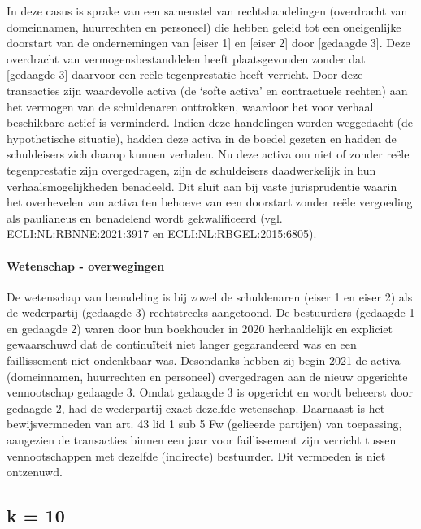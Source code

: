 \documentclass[
  dutch,
  a4paper,
]{article}
\begin{document}
In deze casus is sprake van een samenstel van rechtshandelingen (overdracht van domeinnamen, huurrechten en personeel) die hebben geleid tot een oneigenlijke doorstart van de ondernemingen van {[}eiser 1{]} en {[}eiser 2{]} door {[}gedaagde 3{]}. Deze overdracht van vermogensbestanddelen heeft plaatsgevonden zonder dat {[}gedaagde 3{]} daarvoor een reële tegenprestatie heeft verricht. Door deze transacties zijn waardevolle activa (de `softe activa' en contractuele rechten) aan het vermogen van de schuldenaren onttrokken, waardoor het voor verhaal beschikbare actief is verminderd. Indien deze handelingen worden weggedacht (de hypothetische situatie), hadden deze activa in de boedel gezeten en hadden de schuldeisers zich daarop kunnen verhalen. Nu deze activa om niet of zonder reële tegenprestatie zijn overgedragen, zijn de schuldeisers daadwerkelijk in hun verhaalsmogelijkheden benadeeld. Dit sluit aan bij vaste jurisprudentie waarin het overhevelen van activa ten behoeve van een doorstart zonder reële vergoeding als paulianeus en benadelend wordt gekwalificeerd (vgl. ECLI:NL:RBNNE:2021:3917 en ECLI:NL:RBGEL:2015:6805).

\paragraph{Wetenschap - overwegingen}\label{wetenschap---overwegingen-23}

De wetenschap van benadeling is bij zowel de schuldenaren (eiser 1 en eiser 2) als de wederpartij (gedaagde 3) rechtstreeks aangetoond. De bestuurders (gedaagde 1 en gedaagde 2) waren door hun boekhouder in 2020 herhaaldelijk en expliciet gewaarschuwd dat de continuïteit niet langer gegarandeerd was en een faillissement niet ondenkbaar was. Desondanks hebben zij begin 2021 de activa (domeinnamen, huurrechten en personeel) overgedragen aan de nieuw opgerichte vennootschap gedaagde 3. Omdat gedaagde 3 is opgericht en wordt beheerst door gedaagde 2, had de wederpartij exact dezelfde wetenschap. Daarnaast is het bewijsvermoeden van art. 43 lid 1 sub 5 Fw (gelieerde partijen) van toepassing, aangezien de transacties binnen een jaar voor faillissement zijn verricht tussen vennootschappen met dezelfde (indirecte) bestuurder. Dit vermoeden is niet ontzenuwd.

\newpage


\subsection{k = 10}\label{k-10-2}
\end{document}
